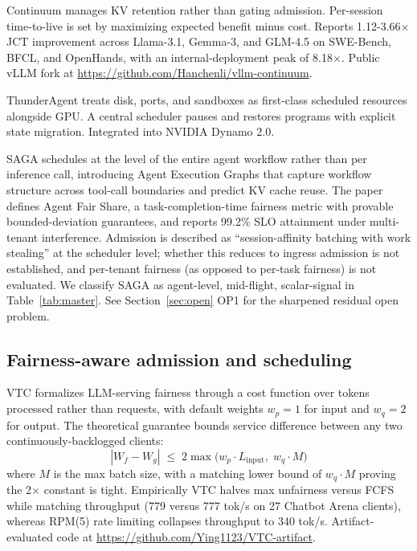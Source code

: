 \documentclass[10pt]{article} %
\theoremstyle{definition}
\begin{document}
Continuum \citep{li2026continuum} manages KV retention rather than
gating admission. Per-session time-to-live is set by maximizing
expected benefit minus cost. Reports 1.12-3.66$\times$ JCT improvement
across Llama-3.1, Gemma-3, and GLM-4.5 on SWE-Bench, BFCL, and
OpenHands, with an internal-deployment peak of 8.18$\times$. Public
vLLM fork at \url{https://github.com/Hanchenli/vllm-continuum}.

ThunderAgent \citep{kang2026thunderagent} treats disk, ports, and
sandboxes as first-class scheduled resources alongside GPU. A central
scheduler pauses and restores programs with explicit state migration.
Integrated into NVIDIA Dynamo 2.0.

SAGA \citep{guo2026saga} schedules at the level of the entire agent
workflow rather than per inference call, introducing Agent Execution
Graphs that capture workflow structure across tool-call boundaries
and predict KV cache reuse. The paper defines Agent Fair Share, a
task-completion-time fairness metric with provable bounded-deviation
guarantees, and reports 99.2\% SLO attainment under multi-tenant
interference. Admission is described as ``session-affinity batching
with work stealing'' at the scheduler level; whether this reduces to
ingress admission is not established, and per-tenant fairness (as
opposed to per-task fairness) is not evaluated. We classify SAGA as
agent-level, mid-flight, scalar-signal in Table~\ref{tab:master}.
See Section~\ref{sec:open} OP1 for the sharpened residual open
problem.

\subsection{Fairness-aware admission and scheduling}

VTC \citep{sheng2024vtc} formalizes LLM-serving fairness through a
cost function over tokens processed rather than requests, with default
weights $w_p = 1$ for input and $w_q = 2$ for output. The theoretical
guarantee bounds service difference between any two
continuously-backlogged clients:
%
\begin{equation}
|W_f - W_g| \;\le\; 2 \max\bigl(w_p \cdot L_{\text{input}},\; w_q \cdot M\bigr)
\label{eq:vtc-bound}
\end{equation}
%
where $M$ is the max batch size, with a matching lower bound of
$w_q \cdot M$ proving the 2$\times$ constant is tight. Empirically VTC
halves max unfairness versus FCFS while matching throughput (779
versus 777 tok/s on 27 Chatbot Arena clients), whereas RPM(5) rate
limiting collapses throughput to 340 tok/s. Artifact-evaluated code at
\url{https://github.com/Ying1123/VTC-artifact}.
\end{document}
